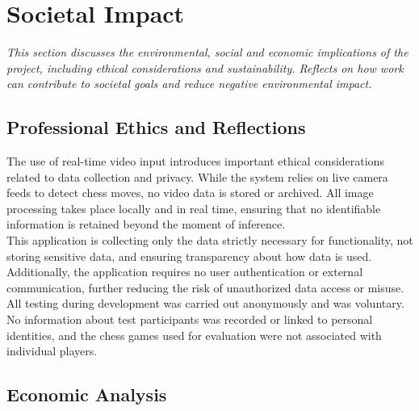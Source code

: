 \chapter{Societal Impact}

\begin{center}
    \textit{This section discusses the environmental, social and economic implications of the project, including ethical considerations and sustainability. Reflects on how work can contribute to societal goals and reduce negative environmental impact.}
\end{center}

\section{Professional Ethics and Reflections}
The use of real-time video input introduces important ethical considerations related to data collection and privacy. While the system relies on live camera feeds to detect chess moves, no video data is stored or archived. All image processing takes place locally and in real time, ensuring that no identifiable information is retained beyond the moment of inference. \\

This application is collecting only the data strictly necessary for functionality, not storing sensitive data, and ensuring transparency about how data is used. Additionally, the application requires no user authentication or external communication, further reducing the risk of unauthorized data access or misuse. \\

All testing during development was carried out anonymously and was voluntary. No information about test participants was recorded or linked to personal identities, and the chess games used for evaluation were not associated with individual players. \\

\section{Economic Analysis}



